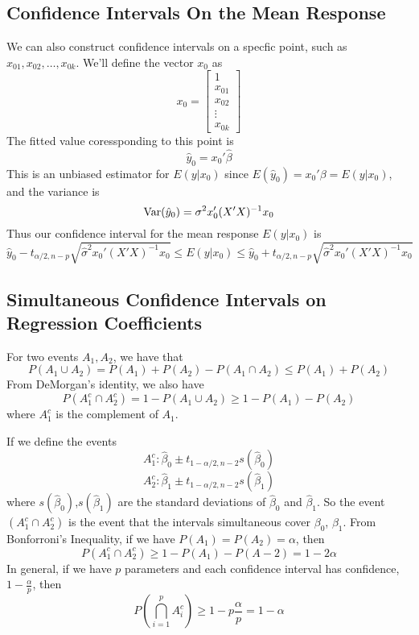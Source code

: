 \subsection{Confidence Intervals On the Mean Response}
\renewcommand{\arraystretch}{1.25}
We can also construct confidence intervals on a specfic point, such as $x_{01},x_{02}, \ldots, x_{0k}$. We'll define the vector $x_0$ as 
\[x_0 = \begin{bmatrix}
    1 \\ x_{01} \\ x_{02} \\ \vdots \\ x_{0k}
\end{bmatrix}\]
The fitted value coressponding to this point is 
\[\hat{y}_0 = x_0'\hat{\beta}\]
This is an unbiased estimator for $E(y|x_0)$ since $E(\hat{y}_0) = x_0'\beta = E(y|x_0)$, and the variance is 
\[\operatorname{Var}(\hat{y}_0) = \sigma^2x_0'(X'X)^{-1}x_0\]
Thus our confidence interval for the mean response $E(y|x_0)$ is 
\[\hat{y}_0 - t_{\alpha/2,n-p}\sqrt{\hat{\sigma}^2x_0'(X'X)^{-1}x_0} \leq E(y|x_0) \leq \hat{y}_0 + t_{\alpha/2,n-p}\sqrt{\hat{\sigma}^2x_0'(X'X)^{-1}x_0}\]
\subsection{Simultaneous Confidence Intervals on Regression Coefficients}
\begin{theorem}
    For two events $A_1, A_2$, we have that 
    \[P(A_1 \cup A_2) = P(A_1) + P(A_2) - P(A_1 \cap A_2) \leq P(A_1) + P(A_2)\]
    From DeMorgan's identity, we also have 
    \[P(A_1^c \cap A_2^c) = 1 - P(A_1 \cup A_2) \geq 1 - P(A_1) - P(A_2)\]
    where $A_1^c$ is the complement of $A_1$.
\end{theorem}
\noindent
If we define the events 
\[A_1^c: \hat{\beta}_0 \pm t_{1-\alpha/2, n-2}s(\hat{\beta}_0)\]
\[A_2^c: \hat{\beta}_1 \pm t_{1-\alpha/2, n-2}s(\hat{\beta}_1)\]
where $s(\hat{\beta}_0)$,$s(\hat{\beta}_1)$ are the standard deviations of $\hat{\beta}_0$ and $\hat{\beta}_1$. So the event $(A_1^c \cap A_2^c)$ is the event that the intervals simultaneous cover $\beta_0$, $\beta_1$. From Bonforroni's Inequality, if we have $P(A_1) = P(A_2) = \alpha$, then 
\[P(A_1^c \cap A_2^c) \geq 1 - P(A_1) - P(A-2) = 1 - 2\alpha\]
In general, if we have $p$ parameters and each confidence interval has confidence, $1- \frac{\alpha}{p}$, then 
\[P\left(\bigcap_{i=1}^p A_i^c\right) \geq 1 - p\frac{\alpha}{p} = 1 - \alpha\]
